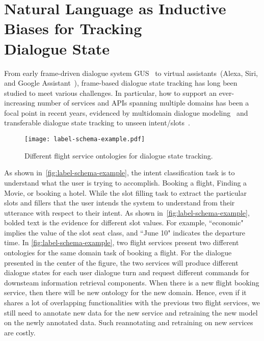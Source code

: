 \chapter[Natural Language as Inductive Biases for Tracking \\Dialogue State]{Natural Language as Inductive \\Biases for Tracking \\Dialogue State}
\label{chap:sgd}

From early frame-driven dialogue system GUS~\citep{bobrow1977gus} to
virtual assistants~(Alexa, Siri, and Google Assistant~\etal),
frame-based dialogue state tracking has long been studied to meet
various challenges. In particular, how to support an ever-increasing
number of services and APIs spanning multiple domains has been a focal
point in recent years, evidenced by multidomain dialogue
modeling~\citep{budzianowski2018multiwoz,byrne2019taskmaster,
  shah-etal-2018-bootstrapping} and transferable dialogue state tracking
to unseen intent/slots~\cite{mrkvsic2017neural,
  wu2019transferable, hosseini2020simple}.

\begin{figure}[!th]
\begin{center}
\texttt{[image: label-schema-example.pdf]}
\end{center}
\caption{\label{fig:label-schema-example} Different flight service
  ontologies for dialogue state tracking.}
\end{figure}

As shown in~\autoref{fig:label-schema-example}, the intent
classification task is to understand what the user is trying to
accomplish. Booking a flight, Finding a Movie, or booking a
hotel. While the slot filling task to extract the particular slots and
fillers that the user intends the system to understand from their
utterance with respect to their intent. As shown
in~\autoref{fig:label-schema-example}, bolded text is the evidence for
different slot values. For example, ``economic" implies the value of
the slot seat class, and ``June 10" indicates the departure time. In
\autoref{fig:label-schema-example}, two flight services present two
different ontologies for the same domain task of booking a flight. For
the dialogue presented in the center of the figure, the two services
will produce different dialogue states for each user dialogue turn and
request different commands for downsteam information retrieval
components. When there is a new flight booking service, then there
will be new ontology for the new domain. Hence, even if it shares a
lot of overlapping functionalities with the previous two flight
services, we still need to annotate new data for the new service and
retraining the new model on the newly annotated data. Such
reannotating and retraining on new services are costly.

